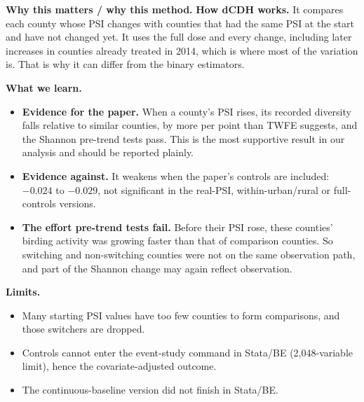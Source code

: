 \documentclass[11pt]{article}
\newcommand{\why}[1]{\begin{whybox}\small\textbf{Why this matters / why this method.} #1\end{whybox}}
\begin{document}
\why{\textbf{How dCDH works.} It compares each county whose PSI changes with counties that had the same PSI at the start and have not changed yet. It uses the full dose and every change, including later increases in counties already treated in 2014, which is where most of the variation is. That is why it can differ from the binary estimators.

\textbf{What we learn.}
\begin{itemize}[leftmargin=12pt,itemsep=1pt,topsep=1pt]
\item \textbf{Evidence for the paper.} When a county's PSI rises, its recorded diversity falls relative to similar counties, by more per point than TWFE suggests, and the Shannon pre-trend tests pass. This is the most supportive result in our analysis and should be reported plainly.
\item \textbf{Evidence against.} It weakens when the paper's controls are included: $-0.024$ to $-0.029$, not significant in the real-PSI, within-urban/rural or full-controls versions.
\item \textbf{The effort pre-trend tests fail.} Before their PSI rose, these counties' birding activity was growing faster than that of comparison counties. So switching and non-switching counties were not on the same observation path, and part of the Shannon change may again reflect observation.
\end{itemize}

\textbf{Limits.}
\begin{itemize}[leftmargin=12pt,itemsep=1pt,topsep=1pt]
\item Many starting PSI values have too few counties to form comparisons, and those switchers are dropped.
\item Controls cannot enter the event-study command in Stata/BE (2,048-variable limit), hence the covariate-adjusted outcome.
\item The continuous-baseline version did not finish in Stata/BE.
\end{itemize}}

\end{document}
